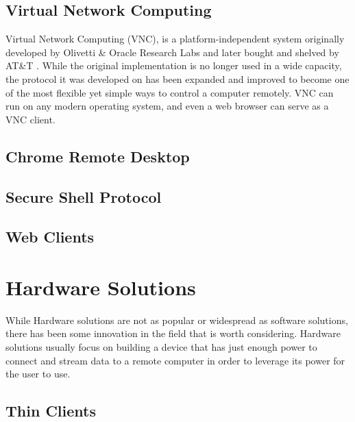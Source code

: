 \subsection{Virtual Network Computing}\label{subsec:VirtualNetworkComputing}

Virtual Network Computing (VNC), is a platform-independent system originally developed by Olivetti \& Oracle Research Labs and later bought and shelved by AT\&T \cite{vncFlavors}.
While the original implementation is no longer used in a wide capacity, the protocol it was developed on has been expanded and improved to become one of the most flexible yet simple ways to control a computer remotely.
VNC can run on any modern operating system, and even a web browser can serve as a VNC client.



\subsection{Chrome Remote Desktop}\label{subsec:ChromeRemoteDesktop}

\todosection


\subsection{Secure Shell Protocol}\label{subsec:SecureShellProtocol}

\todosection


\subsection{Web Clients}\label{subsec:WebClients}

\todosection


\section{Hardware Solutions}\label{sec:HardwareSolutions}

While Hardware solutions are not as popular or widespread as software solutions, there has been some innovation in the field that is worth considering.
Hardware solutions usually focus on building a device that has just enough power to connect and stream data to a remote computer in order to leverage its power for the user to use.


\subsection{Thin Clients}\label{subsec:ThinClients}

